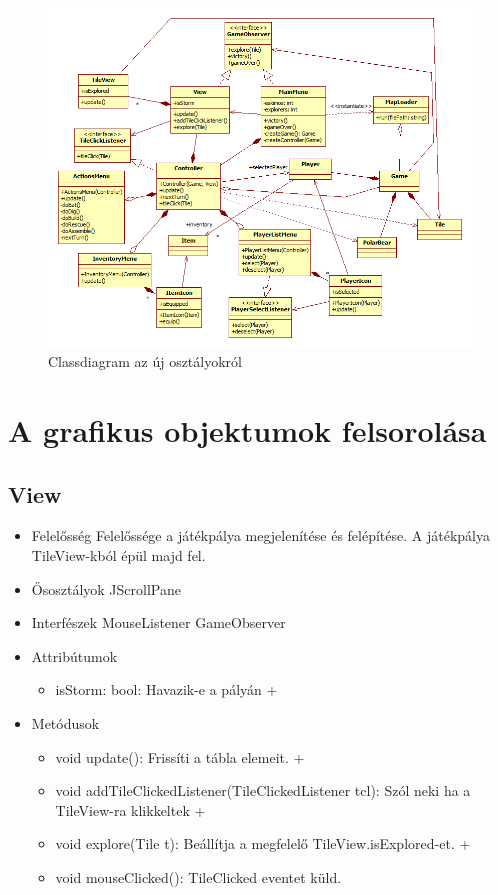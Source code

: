 \begin{figure}[H]
	\begin{center}
		\includegraphics[width=17cm]{chapters/chapter11/classdiagram.png}
		\caption{Classdiagram az új osztályokról}
		\label{fig:classdiagram}
	\end{center}
\end{figure}

\section{A grafikus objektumok felsorolása}

\subsection{View}
\begin{itemize}
\item Felelősség\newline
Felelőssége a játékpálya megjelenítése és felépítése. A játékpálya TileView-kból épül majd fel.
\item Ősosztályok\newline
JScrollPane
\item Interfészek\newline
MouseListener GameObserver
\item Attribútumok\newline
	\begin{itemize}
		\item isStorm: bool: Havazik-e a pályán +
	\end{itemize}
\item Metódusok\newline
	\begin{itemize}
		\item void update(): Frissíti a tábla elemeit. +
		\item void addTileClickedListener(TileClickedListener tcl): Szól neki ha a TileView-ra klikkeltek +
		\item void explore(Tile t): Beállítja a megfelelő TileView.isExplored-et. +
		\item void mouseClicked(): TileClicked eventet küld.
	\end{itemize}
\end{itemize}

